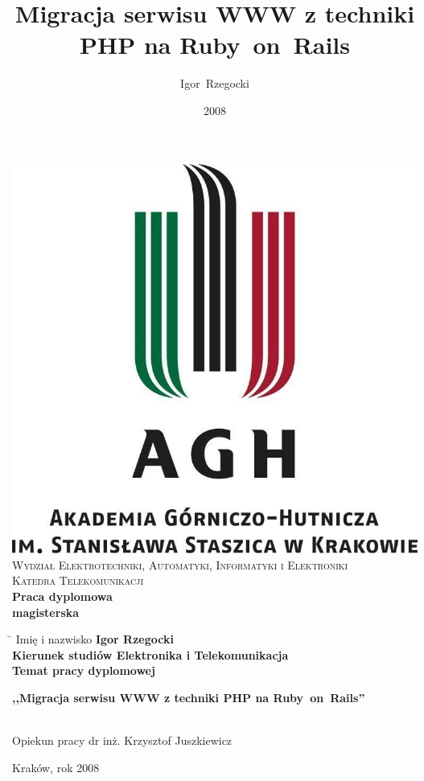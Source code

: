 \documentclass[a4paper,12pt,oneside]{report}
\author{Igor~Rzegocki}
\title{Migracja serwisu WWW z techniki PHP na Ruby~on~Rails}
\date{2008}
\begin{document}
{}
\begin{titlepage}
  \begin{center}
  \includegraphics[keepaspectratio]{agh-logo.jpg}\\[0.5cm]
  \textsc{\large Wydział Elektrotechniki, Automatyki, Informatyki i Elektroniki}\\[0.5cm]
  \textsc{\large Katedra Telekomunikacji}\\[1.5cm]
  \textbf{\huge Praca dyplomowa}\\[1cm]
  \textbf{\large magisterska}\\[2.5cm]
  \begin{tabbing}
    \hspace{0.45\textwidth}\=\kill
    \large Imię i nazwisko \> \large \bfseries Igor Rzegocki\\[0.25cm]
    \large Kierunek studiów \> \large Elektronika i Telekomunikacja\\[0.25cm]
    \large Temat pracy dyplomowej \> \parbox{0.55\textwidth}{\large \bfseries ,,Migracja serwisu WWW z techniki PHP na Ruby~on~Rails''}\\[2cm]
    \large Opiekun pracy \> \large dr inż. Krzysztof Juszkiewicz\\[2cm]
  \end{tabbing}
  \vfill
  {\large Kraków, rok 2008}
  \end{center}
\end{titlepage}
\end{document}
